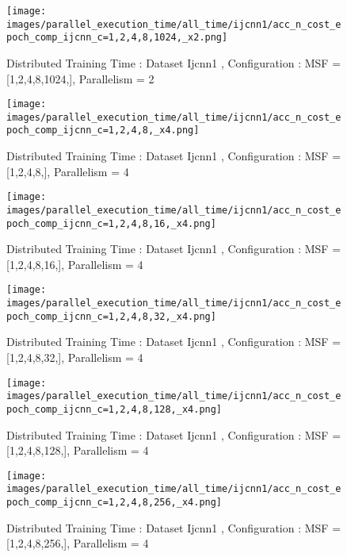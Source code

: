 \begin{figure*}[htbp]
\centering
\texttt{[image: images/parallel\_execution\_time/all\_time/ijcnn1/acc\_n\_cost\_epoch\_comp\_ijcnn\_c=1,2,4,8,1024,\_x2.png]}
\caption{Distributed Training Time : Dataset Ijcnn1 , Configuration : MSF = [1,2,4,8,1024,], Parallelism = 2}
\label{fig:dis-msf-tr-time-ijcnn1-x2}
\end{figure*}


\begin{figure*}[htbp]
\centering
\texttt{[image: images/parallel\_execution\_time/all\_time/ijcnn1/acc\_n\_cost\_epoch\_comp\_ijcnn\_c=1,2,4,8,\_x4.png]}
\caption{Distributed Training Time : Dataset Ijcnn1 , Configuration : MSF = [1,2,4,8,], Parallelism = 4}
\label{fig:dis-msf-tr-time-ijcnn1-x4}
\end{figure*}


\begin{figure*}[htbp]
\centering
\texttt{[image: images/parallel\_execution\_time/all\_time/ijcnn1/acc\_n\_cost\_epoch\_comp\_ijcnn\_c=1,2,4,8,16,\_x4.png]}
\caption{Distributed Training Time : Dataset Ijcnn1 , Configuration : MSF = [1,2,4,8,16,], Parallelism = 4}
\label{fig:dis-msf-tr-time-ijcnn1-x4}
\end{figure*}


\begin{figure*}[htbp]
\centering
\texttt{[image: images/parallel\_execution\_time/all\_time/ijcnn1/acc\_n\_cost\_epoch\_comp\_ijcnn\_c=1,2,4,8,32,\_x4.png]}
\caption{Distributed Training Time : Dataset Ijcnn1 , Configuration : MSF = [1,2,4,8,32,], Parallelism = 4}
\label{fig:dis-msf-tr-time-ijcnn1-x4}
\end{figure*}


\begin{figure*}[htbp]
\centering
\texttt{[image: images/parallel\_execution\_time/all\_time/ijcnn1/acc\_n\_cost\_epoch\_comp\_ijcnn\_c=1,2,4,8,128,\_x4.png]}
\caption{Distributed Training Time : Dataset Ijcnn1 , Configuration : MSF = [1,2,4,8,128,], Parallelism = 4}
\label{fig:dis-msf-tr-time-ijcnn1-x4}
\end{figure*}


\begin{figure*}[htbp]
\centering
\texttt{[image: images/parallel\_execution\_time/all\_time/ijcnn1/acc\_n\_cost\_epoch\_comp\_ijcnn\_c=1,2,4,8,256,\_x4.png]}
\caption{Distributed Training Time : Dataset Ijcnn1 , Configuration : MSF = [1,2,4,8,256,], Parallelism = 4}
\label{fig:dis-msf-tr-time-ijcnn1-x4}
\end{figure*}


